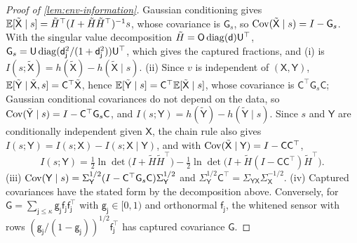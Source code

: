 \begin{proof}[Proof of \cref{lem:env-information}]
Gaussian conditioning gives $\mathbb{E}[\tilde{\mathsf X}\mid s]=\tilde H^\top(I+\tilde H\tilde H^\top)^{-1}s$, whose covariance is $\mathsf G_s$, so $\operatorname{Cov}(\tilde{\mathsf X}\mid s)=I-\mathsf G_s$. With the singular value decomposition $\tilde H=\mathsf O\operatorname{diag}(\mathsf d)\mathsf U^\top$, $\mathsf G_s=\mathsf U\operatorname{diag}(\mathsf d_{\mathsf j}^2/(1+\mathsf d_{\mathsf j}^2))\mathsf U^\top$, which gives the captured fractions, and (i) is $I(s;\tilde{\mathsf X})=h(\tilde{\mathsf X})-h(\tilde{\mathsf X}\mid s)$. (ii) Since $v$ is independent of $(\mathsf X,\mathsf Y)$, $\mathbb{E}[\tilde{\mathsf Y}\mid\tilde{\mathsf X},s]=\mathsf C^\top\tilde{\mathsf X}$, hence $\mathbb{E}[\tilde{\mathsf Y}\mid s]=\mathsf C^\top\mathbb{E}[\tilde{\mathsf X}\mid s]$, whose covariance is $\mathsf C^\top\mathsf G_s\mathsf C$; Gaussian conditional covariances do not depend on the data, so $\operatorname{Cov}(\tilde{\mathsf Y}\mid s)=I-\mathsf C^\top\mathsf G_s\mathsf C$, and $I(s;\mathsf Y)=h(\tilde{\mathsf Y})-h(\tilde{\mathsf Y}\mid s)$. Since $s$ and $\mathsf Y$ are conditionally independent given $\mathsf X$, the chain rule also gives $I(s;\mathsf Y)=I(s;\mathsf X)-I(s;\mathsf X\mid\mathsf Y)$, and with $\operatorname{Cov}(\tilde{\mathsf X}\mid\mathsf Y)=I-\mathsf C\mathsf C^\top$,
\begin{equation}\label{eq:env-second-form}
I(s;\mathsf Y)=\tfrac12\ln\det\bigl(I+\tilde H\tilde H^\top\bigr)-\tfrac12\ln\det\bigl(I+\tilde H(I-\mathsf C\mathsf C^\top)\tilde H^\top\bigr).
\end{equation}
(iii) $\operatorname{Cov}(\mathsf Y\mid s)=\Sigma_{\mathsf Y}^{1/2}(I-\mathsf C^\top\mathsf G_s\mathsf C)\Sigma_{\mathsf Y}^{1/2}$ and $\Sigma_{\mathsf Y}^{1/2}\mathsf C^\top=\Sigma_{\mathsf Y\mathsf X}\Sigma_{\mathsf X}^{-1/2}$. (iv) Captured covariances have the stated form by the decomposition above. Conversely, for $\mathsf G=\sum_{\mathsf j\le\kappa}\mathsf g_{\mathsf j}\mathsf f_{\mathsf j}\mathsf f_{\mathsf j}^\top$ with $\mathsf g_{\mathsf j}\in[0,1)$ and orthonormal $\mathsf f_{\mathsf j}$, the whitened sensor with rows $(\mathsf g_{\mathsf j}/(1-\mathsf g_{\mathsf j}))^{1/2}\mathsf f_{\mathsf j}^\top$ has captured covariance $\mathsf G$.
\end{proof}

